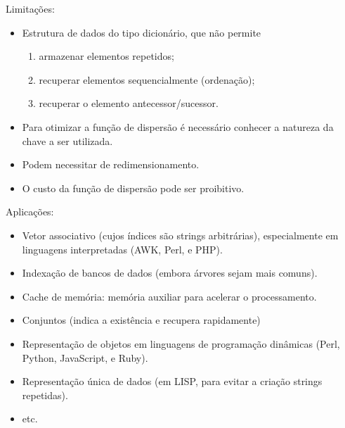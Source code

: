 \documentclass{UnBeamer}%
\begin{document}
	\begin{frame}
		Limitações:
		\begin{itemize}[<+->]
			\item Estrutura de dados do tipo dicionário, que não permite
				\begin{enumerate}
					\item armazenar elementos repetidos;
					\item recuperar elementos sequencialmente (ordenação);
					\item recuperar o elemento antecessor/sucessor.
				\end{enumerate}\vfill
			\item Para otimizar a função de dispersão é necessário conhecer a
			natureza da chave a ser utilizada.
				\vfill
			\item Podem necessitar de redimensionamento.\vfill
			\item O custo da função de dispersão pode ser proibitivo.
		\end{itemize}
	\end{frame}


	\begin{frame}
		Aplicações:
		\begin{itemize}[<+->]
			\item Vetor associativo (cujos índices são strings arbitrárias),
			especialmente em linguagens interpretadas (AWK, Perl, e PHP).
			\item Indexação de bancos de dados \pause (embora árvores sejam mais comuns).
			\item Cache de memória: memória auxiliar para acelerar o processamento.
			\item Conjuntos (indica a existência e recupera rapidamente)
			\item Representação de objetos em linguagens de programação dinâmicas (Perl, Python, JavaScript, e Ruby).
			\item Representação única de dados (em LISP, para evitar a criação strings repetidas).
			\item etc.
		\end{itemize}
	\end{frame}
\end{document}
